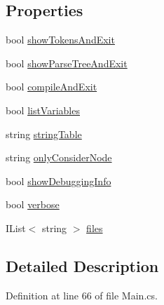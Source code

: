 \subsection*{Properties}
\begin{DoxyCompactItemize}
\item 
bool \hyperlink{a00169_ab1a387df201e3e136c15e5744219628d}{show\-Tokens\-And\-Exit}
\item 
bool \hyperlink{a00169_abef6bf44ae4792d7644b1c02de625208}{show\-Parse\-Tree\-And\-Exit}
\item 
bool \hyperlink{a00169_af9b6917244075618720f2a90bbe6ef56}{compile\-And\-Exit}
\item 
bool \hyperlink{a00169_a062775744f2d7144527fa3bca4b9b3ce}{list\-Variables}
\item 
string \hyperlink{a00099_a7e43c3b73722956cb0f5d507e4eef527}{string\-Table}
\item 
string \hyperlink{a00099_af4c0062a1d46281d377f87084fde374e}{only\-Consider\-Node}
\item 
bool \hyperlink{a00040_a89964ea17bd19caf00cb5bff563ed01c}{show\-Debugging\-Info}
\item 
bool \hyperlink{a00040_ada4d83d1756918f362d55f6649b82b17}{verbose}
\item 
I\-List$<$ string $>$ \hyperlink{a00040_aa93cbb1bc1d5328e0a417012621e92d2}{files}
\end{DoxyCompactItemize}


\subsection{Detailed Description}


Definition at line 66 of file Main.\-cs.



